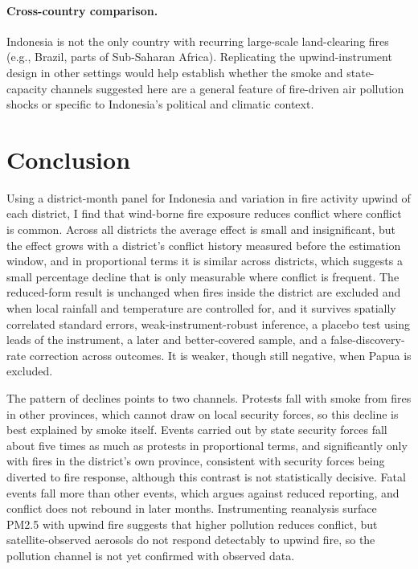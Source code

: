 \documentclass[12pt]{article}
\begin{document}
\paragraph{Cross-country comparison.} Indonesia is not the only country with recurring large-scale land-clearing fires (e.g., Brazil, parts of Sub-Saharan Africa). Replicating the upwind-instrument design in other settings would help establish whether the smoke and state-capacity channels suggested here are a general feature of fire-driven air pollution shocks or specific to Indonesia's political and climatic context.

\section{Conclusion}
\label{sec:conclusion}

Using a district-month panel for Indonesia and variation in fire activity upwind of each district, I find that wind-borne fire exposure reduces conflict where conflict is common. Across all districts the average effect is small and insignificant, but the effect grows with a district's conflict history measured before the estimation window, and in proportional terms it is similar across districts, which suggests a small percentage decline that is only measurable where conflict is frequent. The reduced-form result is unchanged when fires inside the district are excluded and when local rainfall and temperature are controlled for, and it survives spatially correlated standard errors, weak-instrument-robust inference, a placebo test using leads of the instrument, a later and better-covered sample, and a false-discovery-rate correction across outcomes. It is weaker, though still negative, when Papua is excluded.

The pattern of declines points to two channels. Protests fall with smoke from fires in other provinces, which cannot draw on local security forces, so this decline is best explained by smoke itself. Events carried out by state security forces fall about five times as much as protests in proportional terms, and significantly only with fires in the district's own province, consistent with security forces being diverted to fire response, although this contrast is not statistically decisive. Fatal events fall more than other events, which argues against reduced reporting, and conflict does not rebound in later months. Instrumenting reanalysis surface PM2.5 with upwind fire suggests that higher pollution reduces conflict, but satellite-observed aerosols do not respond detectably to upwind fire, so the pollution channel is not yet confirmed with observed data.
\end{document}
